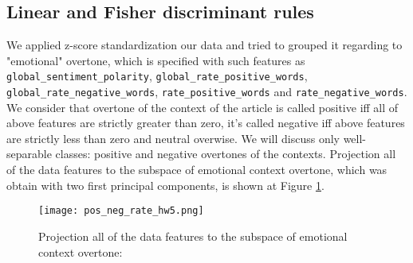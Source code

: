 \subsection{Linear and Fisher discriminant rules}
We applied z-score standardization our data and tried to grouped it regarding to "emotional" overtone, which is specified with such features as \texttt{global\_sentiment\_polarity}, \texttt{global\_rate\_positive\_words}, \texttt{global\_rate\_negative\_words}, \texttt{rate\_positive\_words} and \texttt{rate\_negative\_words}. We consider that overtone of the context of the article is called positive iff all of above features are strictly greater than zero, it's called negative iff above features are strictly less than zero and neutral overwise. We will discuss only well-separable classes: positive and negative overtones of the contexts. Projection all of the data features to the subspace of emotional context overtone, which was obtain with two first principal components, is shown at Figure \ref{fig:svd_to_positive_negarive_contexts_assign5}. 

\begin{figure}[h!]
 \begin{center}
    \center \texttt{[image: pos\_neg\_rate\_hw5.png]}
   \caption{Projection all of the data features to the subspace of emotional context overtone:}
   \label{fig:svd_to_positive_negarive_contexts_assign5}
 \end{center}
\end{figure} 
